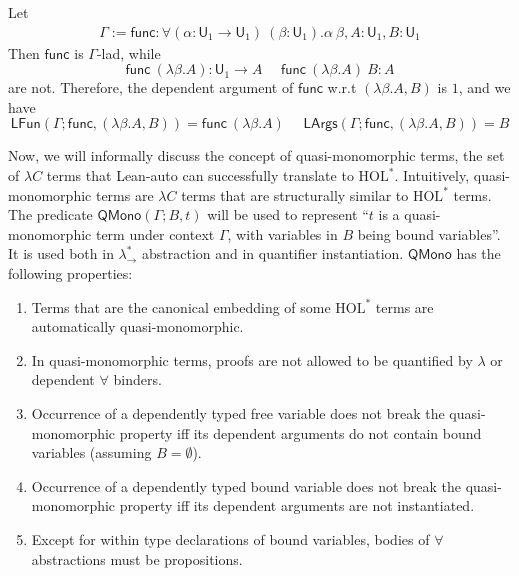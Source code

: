 \begin{example} Let
  \begin{align*}
    \Gamma := \mathsf{func} : \forall (\alpha : \mathsf{U}_1 \to \mathsf{U}_1) \ (\beta : \mathsf{U}_1). \alpha \ \beta,
      A : \mathsf{U}_1, B : \mathsf{U}_1 
  \end{align*}
  Then $\mathsf{func}$ is $\Gamma$-lad, while
  $$\mathsf{func} \ (\lambda \beta. A) : \mathsf{U}_1 \to A \ \ \ \ \ \
  \mathsf{func} \ (\lambda \beta. A) \ B : A$$
  are not. Therefore, the dependent argument of $\mathsf{func}$ w.r.t $(\lambda \beta. A, B)$ is $1$, and
  we have
  $$\mathsf{LFun}(\Gamma; \mathsf{func}, (\lambda \beta. A, B)) = \mathsf{func} \ (\lambda \beta . A) \ \ \ \ \ \
  \mathsf{LArgs}(\Gamma; \mathsf{func}, (\lambda \beta. A, B)) = B$$
\end{example}

  Now, we will informally discuss the concept of quasi-monomorphic terms, the set of $\lambda C$ terms
  that Lean-auto can successfully translate to $\text{HOL}^*$. Intuitively, quasi-monomorphic
  terms are $\lambda C$ terms that are structurally similar to $\text{HOL}^*$ terms. The
  predicate $\mathsf{QMono}(\Gamma; B, t)$ will be used to represent ``$t$ is a quasi-monomorphic
  term under context $\Gamma$, with variables in $B$ being bound variables''. It
  is used both in $\lambda_\to^*$ abstraction and in quantifier instantiation.
  $\mathsf{QMono}$ has the following properties:

  \begin{enumerate}
    \item Terms that are the canonical embedding of some $\text{HOL}^*$ terms are automatically quasi-monomorphic.
    \item In quasi-monomorphic terms, proofs are not allowed to be quantified by
      $\lambda$ or dependent $\forall$ binders.
    \item Occurrence of a dependently typed free variable does not break the quasi-monomorphic property iff
      its dependent arguments do not contain bound variables (assuming $B = \emptyset$).
    \item Occurrence of a dependently typed bound variable does not break the quasi-monomorphic property iff
      its dependent arguments are not instantiated.
    \item Except for within type declarations of bound variables, bodies of $\forall$ abstractions must be propositions.
  \end{enumerate}

